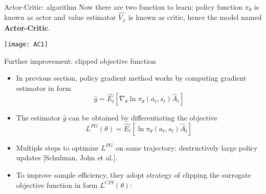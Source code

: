 \begin{frame}{Actor-Critic: algorithm}
    \vspace{0.2cm}
    Now there are two function to learn: policy function $\pi_{\theta}$ is known as actor and value estimator $\hat{V_{\varphi}}$ is known as critic, hence the model named \textbf{Actor-Critic}.
    \begin{center}\texttt{[image: AC1]}\end{center}
\end{frame}

\begin{frame}{Further improvement: clipped objective function}
    \begin{itemize}
        \item In previous section, policy gradient method works by computing gradient estimator in form
            \begin{equation}
                \label{commonPG}
                \hat{g} = \hat{E_t}[\nabla_{\theta}\ln\pi_\theta(a_t,s_t)\hat{A}_{t}]
            \end{equation}
        \item The estimator $\hat{g}$ can be obtained by differentiating the objective
            \begin{equation}
                \label{objPG}
                L^{PG}(\theta) = \hat{E_t}[\ln\pi_\theta(a_t,s_t)\hat{A}_{t}]
            \end{equation}
        \item Multiple steps to optimize $L^{PG}$ on same trajectory: destructively large policy updates \textcolor{CUHKgreen}{\footnotesize[Schulman, John et al.]}. 
        \item To improve sample efficiency, they adopt strategy of clipping the surrogate objective function in form $L^{CPI}(\theta)$:

    \end{itemize} 
\end{frame}

